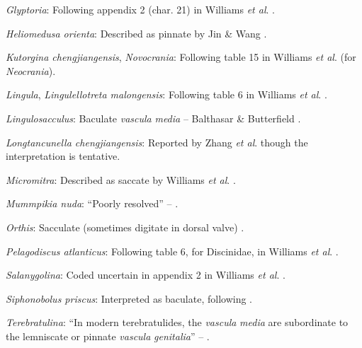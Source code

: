 \documentclass[openany]{book}
\theoremstyle{definition}
\theoremstyle{definition}
\theoremstyle{definition}
\theoremstyle{remark}
\begin{document}
\hypertarget{Glyptoria-coding-25}{}
\emph{Glyptoria}: Following appendix 2 (char. 21) in Williams \emph{et
al}. \citeyearpar{Williams1998Thediversity}.

\hypertarget{Heliomedusa_orienta-coding-25}{}
\emph{Heliomedusa orienta}: Described as pinnate by Jin \& Wang
\citeyearpar{Jin1992Revisionof}.

\hypertarget{Kutorgina_chengjiangensis-coding-25}{}
\emph{Kutorgina chengjiangensis}, \emph{Novocrania}: Following table 15
in Williams \emph{et al}.
\citeyearpar{Williams2000LinguliformeaCraniiformea} (for
\emph{Neocrania}).

\hypertarget{Lingula-coding-25}{}
\emph{Lingula}, \emph{Lingulellotreta malongensis}: Following table 6 in
Williams \emph{et al}.
\citeyearpar{Williams2000LinguliformeaCraniiformea}.

\hypertarget{Lingulosacculus-coding-25}{}
\emph{Lingulosacculus}: Baculate \emph{vascula} \emph{media} --
Balthasar \& Butterfield \citeyearpar{Balthasar2009EarlyCambrian}.

\hypertarget{Longtancunella_chengjiangensis-coding-25}{}
\emph{Longtancunella chengjiangensis}: Reported by Zhang \emph{et al}.
\citeyearpar[2011T]{Zhang2007Agregarious} though the interpretation is
tentative.

\hypertarget{Micromitra-coding-25}{}
\emph{Micromitra}: Described as saccate by Williams \emph{et al}.
\citeyearpar{Williams1998Thediversity}.

\hypertarget{Mummpikia_nuda-coding-25}{}
\emph{Mummpikia nuda}: ``Poorly resolved'' --
\citet{Balthasar2008iMummpikia}.

\hypertarget{Orthis-coding-25}{}
\emph{Orthis}: Sacculate (sometimes digitate in dorsal valve)
\citep[p716]{Williams2000LinguliformeaCraniiformea}.

\hypertarget{Pelagodiscus_atlanticus-coding-25}{}
\emph{Pelagodiscus atlanticus}: Following table 6, for Discinidae, in
Williams \emph{et al}.
\citeyearpar{Williams2000LinguliformeaCraniiformea}.

\hypertarget{Salanygolina-coding-25}{}
\emph{Salanygolina}: Coded uncertain in appendix 2 in Williams \emph{et
al}. \citeyearpar{Williams1998Thediversity}.

\hypertarget{Siphonobolus_priscus-coding-25}{}
\emph{Siphonobolus priscus}: Interpreted as baculate, following
\citet{Havlicek1982LingulaceaPaterinacea}.

\hypertarget{Terebratulina-coding-25}{}
\emph{Terebratulina}: ``In modern terebratulides, the \emph{vascula}
\emph{media} are subordinate to the lemniscate or pinnate \emph{vascula}
\emph{genitalia}'' -- \citet{Williams1997Introduction}.
\end{document}
